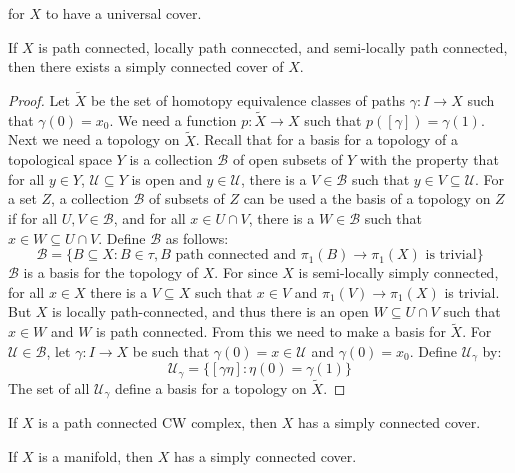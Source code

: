 \documentclass[crop=false,class=book,oneside]{standalone}
\begin{document}
        for $X$ to have a universal cover.
        \begin{theorem}
            If $X$ is path connected, locally path conneccted,
            and semi-locally path connected, then there exists
            a simply connected cover of $X$.
        \end{theorem}
        \begin{proof}
            Let $\tilde{X}$ be the set of homotopy equivalence
            classes of paths $\gamma:I\rightarrow{X}$ such that
            $\gamma(0)=x_{0}$. We need a function
            $p:\tilde{X}\rightarrow{X}$ such that
            $p([\gamma])=\gamma(1)$. Next we need a topology
            on $\tilde{X}$. Recall that for a basis for a topology
            of a topological space $Y$ is a collection
            $\mathcal{B}$ of open subsets of $Y$ with the property
            that for all $y\in{Y}$, $\mathcal{U}\subseteq{Y}$ is
            open and $y\in\mathcal{U}$, there is a $V\in\mathcal{B}$
            such that $y\in{V}\subseteq\mathcal{U}$. For a set
            $Z$, a collection $\mathcal{B}$ of subsets of $Z$
            can be used a the basis of a topology on $Z$ if
            for all $U,V\in\mathcal{B}$, and for all
            $x\in{U}\cap{V}$, there is a $W\in\mathcal{B}$ such
            that $x\in{W}\subseteq{U}\cap{V}$. Define
            $\mathcal{B}$ as follows:
            \begin{equation}
                \mathcal{B}=\{B\subseteq{X}:B\in\tau,
                    B\textrm{ path connected and }
                    \pi_{1}(B)\rightarrow\pi_{1}(X)
                    \textrm{ is trivial}\}
            \end{equation}
            $\mathcal{B}$ is a basis for the topology of
            $X$. For since $X$ is semi-locally simply connected,
            for all $x\in{X}$ there is a $V\subseteq{X}$ such
            that $x\in{V}$ and
            $\pi_{1}(V)\rightarrow\pi_{1}(X)$ is trivial. But
            $X$ is locally path-connected, and thus there is an
            open $W\subseteq{U}\cap{V}$ such that $x\in{W}$ and
            $W$ is path connected. From this we need to make a basis
            for $\tilde{X}$. For $\mathcal{U}\in\mathcal{B}$,
            let $\gamma:I\rightarrow{X}$ be such that
            $\gamma(0)=x\in\mathcal{U}$ and $\gamma(0)=x_{0}$.
            Define $\mathcal{U}_{\gamma}$ by:
            \begin{equation}
                \mathcal{U}_{\gamma}=\{
                    [\gamma\eta]:\eta(0)=\gamma(1)\}
            \end{equation}
            The set of all $\mathcal{U}_{\gamma}$ define a basis
            for a topology on $\tilde{X}$.
        \end{proof}
        \begin{theorem}
            If $X$ is a path connected CW complex, then
            $X$ has a simply connected cover.
        \end{theorem}
        \begin{theorem}
            If $X$ is a manifold, then $X$ has a simply
            connected cover.
        \end{theorem}
\end{document}
